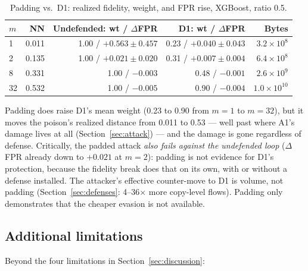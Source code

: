\begin{table}[!t]
  \centering
  \caption{Padding vs.\ D1: realized fidelity, weight, and FPR rise, XGBoost, ratio 0.5.}
  \label{tab:padding}
  \small
  \setlength{\tabcolsep}{3pt}
  \begin{tabular}{lrrrr}
    \toprule
    $m$ & NN & Undefended: wt / $\Delta$FPR & D1: wt / $\Delta$FPR & Bytes \\
    \midrule
    1  & 0.011 & 1.00 / $+0.563\pm0.457$ & 0.23 / $+0.040\pm0.043$ & $3.2\times10^8$ \\
    2  & 0.135 & 1.00 / $+0.021\pm0.020$ & 0.31 / $+0.007\pm0.004$ & $6.4\times10^8$ \\
    8  & 0.331 & 1.00 / $-0.003$          & 0.48 / $-0.001$          & $2.6\times10^9$ \\
    32 & 0.532 & 1.00 / $-0.005$          & 0.90 / $-0.004$          & $1.0\times10^{10}$ \\
    \bottomrule
  \end{tabular}
\end{table}

Padding does raise D1's mean weight (0.23 to 0.90 from $m=1$ to $m=32$), but it moves the
poison's realized distance from 0.011 to 0.53 — well past where A1's damage lives at all
(Section~\ref{sec:attack}) — and the damage is gone regardless of defense. Critically, the
padded attack \emph{also fails against the undefended loop} ($\Delta$FPR already down to
$+0.021$ at $m=2$): padding is not evidence for D1's protection, because the fidelity break does
that on its own, with or without a defense installed. The attacker's effective counter-move to
D1 is volume, not padding (Section~\ref{sec:defenses}: 4--36$\times$ more copy-level flows).
Padding only demonstrates that the cheaper evasion is not available.

\subsection{Additional limitations}
Beyond the four limitations in Section~\ref{sec:discussion}:

